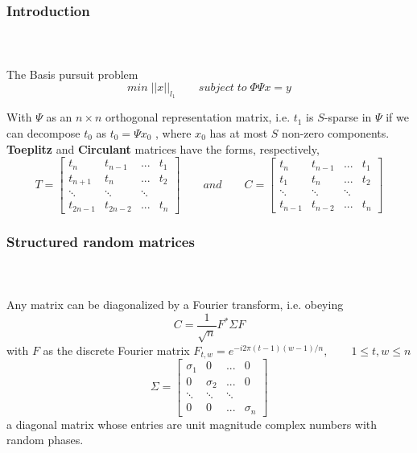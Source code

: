 
\begin{frame}[t]
\frametitle{Introduction}
\framesubtitle{~~}  %

The Basis pursuit problem 
\begin{equation}
min  \;||x||_{l_1} \qquad   subject \; to \; \Phi \Psi x=y
\end{equation}

\small
With $\Psi$ as an $n \times n$ orthogonal representation matrix, i.e. $t_{1}$ is $S$-sparse in $\Psi$ if we can decompose $t_0$ as $t_0=\Psi x_0 $ , where $x_0$ has at most $S$ non-zero components.
\\
\normalfont
\textbf{Toeplitz} and \textbf{Circulant} matrices have the forms, respectively,
\\


$$
T = \begin{bmatrix}
	t_{n} & t_{n-1} & ...& t_{1}           \\[0.3em]
	t_{n+1} & t_n & ... & t_{2} \\[0.3em]
	\ddots &\ddots & \ddots &    \\[0.3em]
	t_{2n-1} & t_{2n-2}& ... & t_{n}         
\end{bmatrix}
\qquad and \qquad
C = \begin{bmatrix}
t_{n} & t_{n-1} & ...& t_{1}           \\[0.3em]
t_{1} & t_{n} & ... & t_{2} \\[0.3em]
\ddots &\ddots & \ddots &      \\[0.3em]
t_{n-1} & t_{n-2}& ... & t_{n}        
\end{bmatrix} 
$$
\end{frame}
\begin{frame}[t]
\frametitle{Structured random matrices}
\framesubtitle{~~}  %
	Any matrix can be diagonalized by a Fourier transform, i.e. obeying
	$$ C=\frac{1}{\sqrt{n}} F^* \Sigma F $$ with $F$ as the discrete Fourier matrix
	$F_{t,w}=e^{-i2\pi(t-1)(w-1)/n}, \qquad 1 \le t,w \le n$
$$
\Sigma = \begin{bmatrix}
	\sigma_{1} & 0 & ...& 0           \\[0.3em]
	0 & \sigma_{2} & ... & 0 \\[0.3em]
	\ddots &\ddots & \ddots &      \\[0.3em]
	0 & 0 & ... & \sigma_{n}        
\end{bmatrix} $$
a diagonal matrix whose entries are unit magnitude complex numbers with random phases.
\end{frame}


